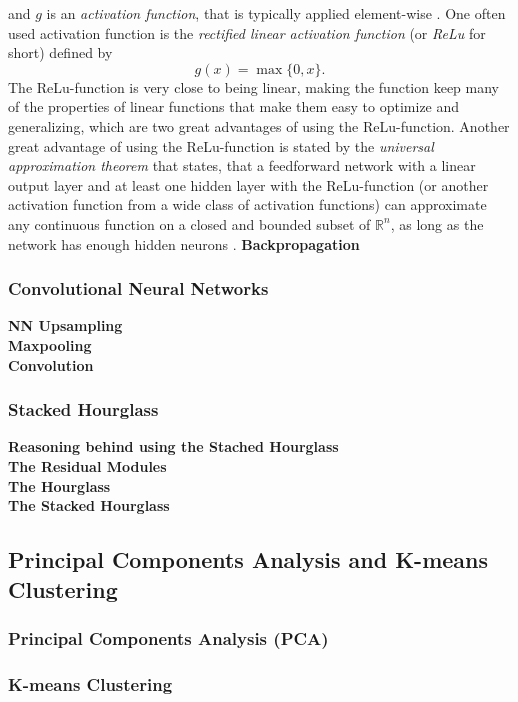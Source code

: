 \documentclass[main.tex]{subfiles}
\begin{document}
and $g$ is an \textit{activation function}, that is typically applied element-wise \cite{DeepLearning} \cite{3b1b_1}. One often used activation function is the \textit{rectified linear activation function} (or \textit{ReLu} for short) defined by
$$g(x) = \max\{0, x\}.$$
The ReLu-function is very close to being linear, making the function keep many of the properties of linear functions that make them easy to optimize and generalizing, which are two great advantages of using the ReLu-function. Another great advantage of using the ReLu-function is stated by the \textit{universal approximation theorem} that states, that a feedforward network with a linear output layer and at least one hidden layer with the ReLu-function (or another activation function from a wide class of activation functions) can approximate any continuous function on a closed and bounded subset of $\mathbb{R}^n$, as long as the network has enough hidden neurons \cite{DeepLearning}. 
\noindent \textbf{Backpropagation} \\

\subsubsection{Convolutional Neural Networks}
\textbf{NN Upsampling} \\
\textbf{Maxpooling} \\
\textbf{Convolution}
\subsubsection{Stacked Hourglass}
\textbf{Reasoning behind using the Stached Hourglass} \\
\textbf{The Residual Modules}\\
\textbf{The Hourglass}\\
\textbf{The Stacked Hourglass}

\subsection{Principal Components Analysis and K-means Clustering}
\subsubsection{Principal Components Analysis (PCA)}
\subsubsection{K-means Clustering}
\end{document}
